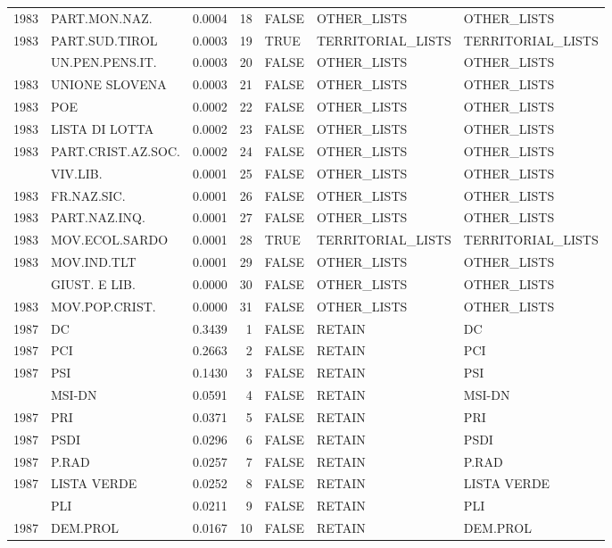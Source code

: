 \begin{longtable}[t]{rlrrlll}
1983 & PART.MON.NAZ. & 0.0004 & 18 & FALSE & OTHER\_LISTS & OTHER\_LISTS\\
1983 & PART.SUD.TIROL & 0.0003 & 19 & TRUE & TERRITORIAL\_LISTS & TERRITORIAL\_LISTS\\
\addlinespace
1983 & UN.PEN.PENS.IT. & 0.0003 & 20 & FALSE & OTHER\_LISTS & OTHER\_LISTS\\
1983 & UNIONE SLOVENA & 0.0003 & 21 & FALSE & OTHER\_LISTS & OTHER\_LISTS\\
1983 & POE & 0.0002 & 22 & FALSE & OTHER\_LISTS & OTHER\_LISTS\\
1983 & LISTA DI LOTTA & 0.0002 & 23 & FALSE & OTHER\_LISTS & OTHER\_LISTS\\
1983 & PART.CRIST.AZ.SOC. & 0.0002 & 24 & FALSE & OTHER\_LISTS & OTHER\_LISTS\\
\addlinespace
1983 & VIV.LIB. & 0.0001 & 25 & FALSE & OTHER\_LISTS & OTHER\_LISTS\\
1983 & FR.NAZ.SIC. & 0.0001 & 26 & FALSE & OTHER\_LISTS & OTHER\_LISTS\\
1983 & PART.NAZ.INQ. & 0.0001 & 27 & FALSE & OTHER\_LISTS & OTHER\_LISTS\\
1983 & MOV.ECOL.SARDO & 0.0001 & 28 & TRUE & TERRITORIAL\_LISTS & TERRITORIAL\_LISTS\\
1983 & MOV.IND.TLT & 0.0001 & 29 & FALSE & OTHER\_LISTS & OTHER\_LISTS\\
\addlinespace
1983 & GIUST. E LIB. & 0.0000 & 30 & FALSE & OTHER\_LISTS & OTHER\_LISTS\\
1983 & MOV.POP.CRIST. & 0.0000 & 31 & FALSE & OTHER\_LISTS & OTHER\_LISTS\\
1987 & DC & 0.3439 & 1 & FALSE & RETAIN & DC\\
1987 & PCI & 0.2663 & 2 & FALSE & RETAIN & PCI\\
1987 & PSI & 0.1430 & 3 & FALSE & RETAIN & PSI\\
\addlinespace
1987 & MSI-DN & 0.0591 & 4 & FALSE & RETAIN & MSI-DN\\
1987 & PRI & 0.0371 & 5 & FALSE & RETAIN & PRI\\
1987 & PSDI & 0.0296 & 6 & FALSE & RETAIN & PSDI\\
1987 & P.RAD & 0.0257 & 7 & FALSE & RETAIN & P.RAD\\
1987 & LISTA VERDE & 0.0252 & 8 & FALSE & RETAIN & LISTA VERDE\\
\addlinespace
1987 & PLI & 0.0211 & 9 & FALSE & RETAIN & PLI\\
1987 & DEM.PROL & 0.0167 & 10 & FALSE & RETAIN & DEM.PROL\\

\end{longtable}
